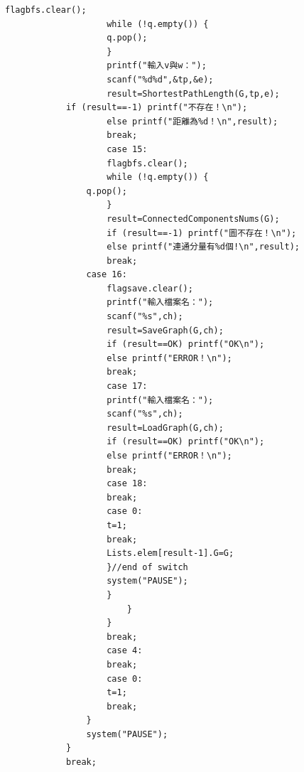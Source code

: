 \documentclass[supercite]{Experimental_Report}
\theoremstyle{definition}
\begin{document}
\begin{lstlisting}[style=commonCodeStyle, caption={目标程序}, label={lst:2-17}]
					flagbfs.clear();
					while (!q.empty()) {
					q.pop(); 
					}
					printf("輸入v與w：");
					scanf("%d%d",&tp,&e);
					result=ShortestPathLength(G,tp,e);
			if (result==-1) printf("不存在！\n");
					else printf("距離為%d！\n",result); 
					break;      
					case 15:
					flagbfs.clear();
					while (!q.empty()) {
				q.pop(); 
					}                                       
					result=ConnectedComponentsNums(G);
					if (result==-1) printf("圖不存在！\n");
					else printf("連通分量有%d個!\n",result);              
					break;  
				case 16:
					flagsave.clear();
					printf("輸入檔案名：");
					scanf("%s",ch);
					result=SaveGraph(G,ch);
					if (result==OK) printf("OK\n");
					else printf("ERROR！\n");                 
					break;
					case 17:
					printf("輸入檔案名：");
					scanf("%s",ch);
					result=LoadGraph(G,ch);
					if (result==OK) printf("OK\n");
					else printf("ERROR！\n");                        
					break;
					case 18:
					break;
					case 0:
					t=1;
					break;
					Lists.elem[result-1].G=G;   	
					}//end of switch
					system("PAUSE");                
					}                               
						}
					}                                   
					break;
					case 4:
					break;
					case 0:
					t=1;
					break;                                                                      
				}       
				system("PAUSE");                        
			}
			break;
			

\end{lstlisting}
\end{document}
